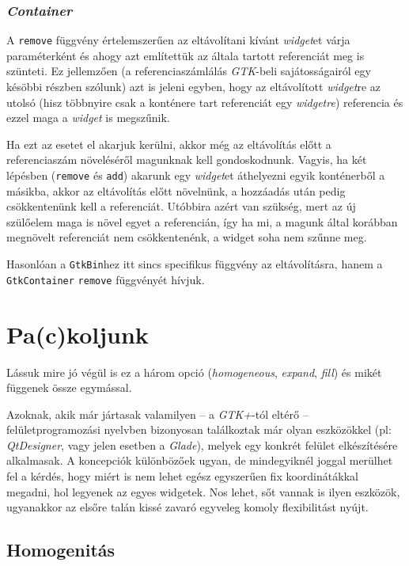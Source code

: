 \subsubsection{\textit{Container}}

A \texttt{remove} függvény értelemszerűen az eltávolítani kívánt \textit{widget}et várja paraméterként és ahogy azt említettük az általa tartott referenciát meg is szünteti. Ez jellemzően (a referenciaszámlálás \textit{GTK}-beli sajátosságairól egy késöbbi részben szólunk) azt is jeleni egyben, hogy az eltávolított \textit{widget}re az utolsó (hisz többnyire csak a konténere tart referenciát egy \textit{widgetre}) referencia és ezzel maga a \textit{widget} is megszűnik.

Ha ezt az esetet el akarjuk kerülni, akkor még az eltávolítás előtt a referenciaszám növeléséről magunknak kell gondoskodnunk. Vagyis, ha két lépésben (\texttt{remove} és \texttt{add}) akarunk egy \textit{widget}et áthelyezni egyik konténerből a másikba, akkor az eltávolítás előtt növelnünk, a hozzáadás után pedig csökkentenünk kell a referenciát. Utóbbira azért van szükség, mert az új szülőelem maga is növel egyet a referencián, így ha mi, a magunk által korábban megnövelt referenciát nem csökkentenénk, a widget soha nem szűnne meg.

Hasonlóan a \texttt{GtkBin}hez itt sincs specifikus függvény az eltávolításra, hanem a \texttt{GtkContainer} \texttt{remove} függvényét hívjuk.

\section{Pa(c)koljunk}
\label{sec:packing}

Lássuk mire jó végül is ez a három opció (\textit{homogeneous}, \textit{expand}, \textit{fill}) és mikét függenek össze egymással.

Azoknak, akik már jártasak valamilyen -- a \textit{GTK+}-tól eltérő -- felületprogramozási nyelvben bizonyosan találkoztak már olyan eszközökkel (pl: \textit{QtDesigner}, vagy jelen esetben a \textit{Glade}), melyek egy konkrét felület elkészítésére alkalmasak. A koncepciók különbözőek ugyan, de mindegyiknél joggal merülhet fel a kérdés, hogy miért is nem lehet egész egyszerűen fix koordinátákkal megadni, hol legyenek az egyes widgetek. Nos lehet, sőt vannak is ilyen eszközök, ugyanakkor az elsőre talán kissé zavaró egyveleg komoly flexibilitást nyújt.

\subsection{Homogenitás}

